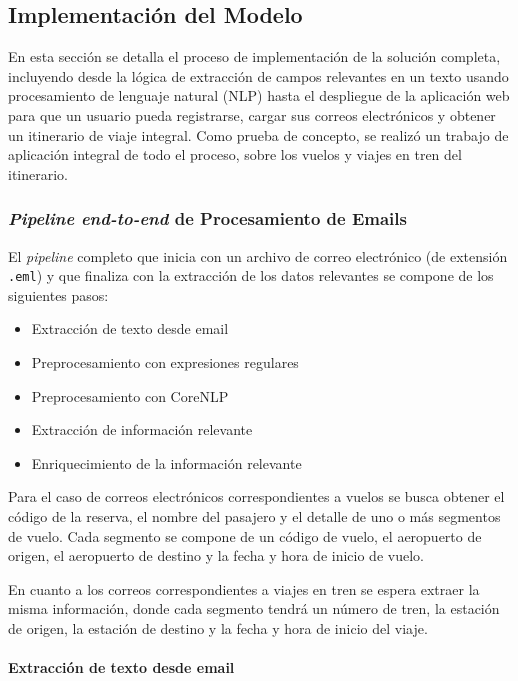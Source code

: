 \subsection{Implementación del Modelo}%
\label{subsec:model-implementation}

En esta sección se detalla el proceso de implementación de la solución completa, incluyendo desde la lógica de
extracción de campos relevantes en un texto usando procesamiento de lenguaje natural (NLP) hasta el despliegue
de la aplicación web para que un usuario pueda registrarse, cargar sus
correos electrónicos y obtener un itinerario de viaje integral.
Como prueba de concepto, se realizó un trabajo de aplicación integral de todo el proceso, sobre los vuelos y viajes
en tren del itinerario.

\subsubsection{\textit{Pipeline end-to-end} de Procesamiento de Emails}

El \textit{pipeline} completo que inicia con un archivo de correo electrónico (de extensión \texttt{.eml}) y que
finaliza con la extracción de los datos relevantes se compone de los siguientes pasos:

\begin{itemize}
    \item Extracción de texto desde email
    \item Preprocesamiento con expresiones regulares
    \item Preprocesamiento con CoreNLP
    \item Extracción de información relevante
    \item Enriquecimiento de la información relevante
\end{itemize}

Para el caso de correos electrónicos correspondientes a vuelos se busca obtener el código de la reserva, el nombre del
pasajero y el detalle de uno o más segmentos de vuelo.
Cada segmento se compone de un código de vuelo, el aeropuerto de origen, el aeropuerto de destino y la fecha y hora de
inicio de vuelo.

En cuanto a los correos correspondientes a viajes en tren se espera extraer la misma información, donde cada segmento
tendrá un número de tren, la estación de origen, la estación de destino y la fecha y hora de inicio del viaje.

\paragraph{Extracción de texto desde email}

